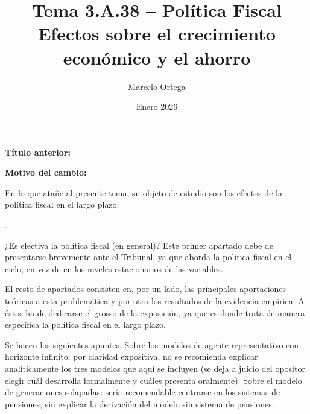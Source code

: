 \documentclass[10pt,a4paper]{article}
\title{Tema 3.A.38 -- Política Fiscal\\
\large Efectos sobre el crecimiento económico y el ahorro}
\author{Marcelo Ortega}
\date{Enero 2026}
\newcounter{numitem}
\newcommand{\puntosclave}[1]{%
  \begin{tcolorbox}[
    colframe=black,
    title={Puntos clave},
    before upper={\setlength{\parindent}{0.5cm}\setlength{\parskip}{0.5\baselineskip}}
  ]
  #1
  \end{tcolorbox}
}
\newenvironment{lnum}
      {\begin{list}{\arabic{numitem}.}{%
          \usecounter{numitem}%
          \setlength{\leftmargin}{1cm}%
          \setlength{\parskip}{3pt}%
          \setlength{\itemsep}{0pt}%
          \setlength{\parsep}{0pt}%
      }}
      {\end{list}}
\newcommand{\changebox}{%
\begin{tcolorbox}[title={Historial de cambios del tema}]
\textbf{Título anterior:} \OldTitle\par
\textbf{Motivo del cambio:} \ChangeWhy
\end{tcolorbox}
}
\begin{document}
\maketitle
\changebox

\newpage

\puntosclave{ %
     En lo que atañe al presente tema, su objeto de estudio son los efectos de la política fiscal en el largo plazo:
     \begin{lnum}
         \item ¿Es efectiva la política fiscal (en general)? Este primer apartado debe de presentarse brevemente ante el Tribunal, ya que aborda la política fiscal en el ciclo, en vez de en los niveles estacionarios de las variables.
         \item El resto de apartados consisten en, por un lado, las principales aportaciones teóricas a esta problemática y por otro los resultados de la evidencia empírica. A éstos ha de dedicarse el grosso de la exposición, ya que es donde trata de manera específica la política fiscal en el largo plazo.
     \end{lnum}

     Se hacen los siguientes apuntes. Sobre los modelos de agente representativo con horizonte infinito: por claridad expositiva, no se recomienda explicar analíticamente los tres modelos que aquí se incluyen (se deja a juicio del opositor elegir cuál desarrolla formalmente y cuáles presenta oralmente). Sobre el modelo de generaciones solapadas: sería recomendable centrarse en los sistemas de pensiones, sin explicar la derivación del modelo sin sistema de pensiones.
     
    }
\vspace{1cm}
\end{document}
